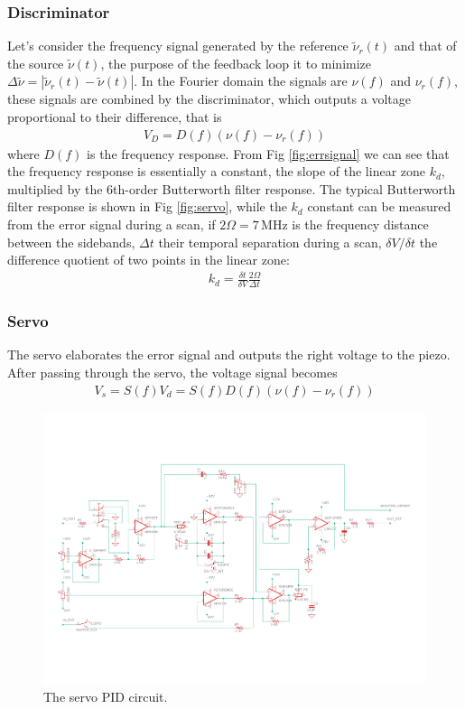 \subsubsection{Discriminator}
Let's consider the frequency signal generated by the reference $\tilde \nu_r(t)$ and that of the source $\tilde \nu(t)$, the purpose of the feedback loop it to minimize $\Delta\tilde\nu = |\tilde\nu_r(t)-\tilde\nu(t)|$. In the Fourier domain the signals are $\nu(f)$ and $\nu_r(f)$, these signals are combined by the discriminator, which outputs a voltage proportional to their difference, that is
\begin{align}
	V_D = D(f) (\nu(f)-\nu_r(f))
\end{align}
where $D(f)$ is the frequency response. From Fig \ref{fig:errsignal} we can see that the frequency response is essentially a constant, the slope of the linear zone $k_d$, multiplied by  the 6th-order Butterworth filter response. The typical Butterworth filter response is shown in Fig \ref{fig:servo}, while the $k_d$ constant can be measured from the error signal during a scan, if $2\Omega =7$\,MHz is the frequency distance between the sidebands, $\Delta t$ their temporal separation during a scan, $\delta V/\delta t$ the difference quotient of two points in the linear zone:
\begin{align}
	k_d = \frac{\delta t}{\delta V} \frac{2\Omega}{\Delta t}
\end{align}

\subsubsection{Servo}
The servo elaborates the error signal and outputs the right voltage to the piezo.
After passing through the servo, the voltage signal becomes
\begin{align}
	V_s = S(f) V_d = S(f)D(f)(\nu(f)-\nu_r(f))
\end{align}
\begin{figure}
	\centering
	\includegraphics[width=0.9\linewidth]{images/pidscheme.pdf}
	\caption{The servo PID circuit.}
	\label{fig:servoscheme}
\end{figure}

